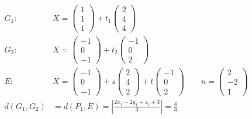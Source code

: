 \begin{align*}
    G_1:\ & X =
    \begin{pmatrix}
        1\\ 1\\ 1
    \end{pmatrix}
    + t_1
    \begin{pmatrix}
        2\\ 4\\ 4
    \end{pmatrix}\\
    G_2:\ & X =
    \begin{pmatrix}
        -1\\ 0\\ -1
    \end{pmatrix}
    + t_2
    \begin{pmatrix}
        -1\\ 0\\ 2
    \end{pmatrix}\\
    E:\ & X =
    \begin{pmatrix}
        -1\\ 0\\ -1
    \end{pmatrix}
    + s
    \begin{pmatrix}
        2\\ 4\\ 2
    \end{pmatrix}
    + t
    \begin{pmatrix}
        -1\\ 0\\ 2
    \end{pmatrix}
    \qquad
    n =
    \begin{pmatrix}
        2\\ -2\\ 1
    \end{pmatrix}\\
    d(G_1, G_2) & = d(P_1, E) = \left| \frac{2 x_1 - 2 y_1 + z_1 + 3}{3} \right| = \frac{4}{3}
\end{align*}

